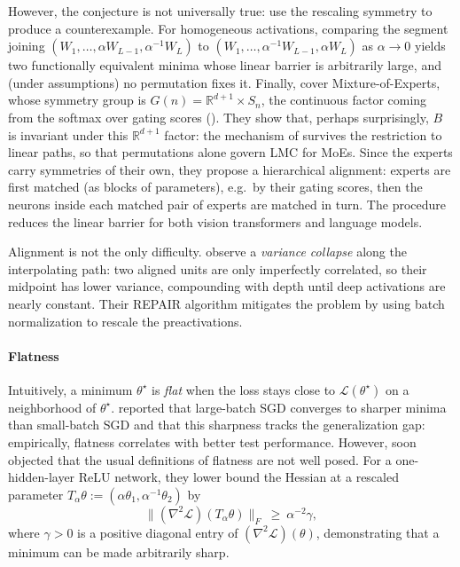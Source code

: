 \documentclass[mathematics,review,submit,moreauthors]{Definitions/mdpi}
\begin{document}
However, the conjecture is not universally true: \citet{zhao2025a} use the rescaling symmetry to produce a counterexample.
For homogeneous activations, comparing the segment joining $(W_1,\dots,\alpha W_{L-1},\alpha^{-1}W_L)$ to $(W_1,\dots,\alpha^{-1}W_{L-1},\alpha W_L)$ as $\alpha\to0$ yields two functionally equivalent minima whose linear barrier is arbitrarily large, and (under assumptions) no permutation fixes it.
Finally, \citet{tran2025anips} cover Mixture-of-Experts, whose symmetry group is $G(n)=\mathbb{R}^{d+1}\times S_n$, the continuous factor coming from the softmax over gating scores ().
They show that, perhaps surprisingly, $B$ is invariant under this $\mathbb{R}^{d+1}$ factor: the mechanism of  survives the restriction to linear paths, so that permutations alone govern LMC for MoEs.
Since the experts carry symmetries of their own, they propose a hierarchical alignment: experts are first matched (as blocks of parameters), e.g.\ by their gating scores, then the neurons inside each matched pair of experts are matched in turn.
The procedure reduces the linear barrier for both vision transformers and language models.

\begin{Remark}
    Alignment is not the only difficulty.
    \citet{jordan2023} observe a \emph{variance collapse} along the interpolating path: two aligned units are only imperfectly correlated, so their midpoint has lower variance, compounding with depth until deep activations are nearly constant.
    Their REPAIR algorithm mitigates the problem by using batch normalization to rescale the preactivations.
\end{Remark}

\paragraph{Flatness}

Intuitively, a minimum $\theta^\star$ is \emph{flat} when the loss stays close to $\mathcal{L}(\theta^\star)$ on a neighborhood of $\theta^\star$.
\citet{keskar2017} reported that large-batch SGD converges to sharper minima than small-batch SGD and that this sharpness tracks the generalization gap: empirically, flatness correlates with better test performance.
However, \citet{dinh2017} soon objected that the usual definitions of flatness are not well posed.
For a one-hidden-layer ReLU network, they lower bound the Hessian at a rescaled parameter $T_\alpha\theta:=(\alpha\theta_1,\alpha^{-1}\theta_2)$ by
\begin{equation}\label{eq:dinh-hessian-bound}
    \big\lVert(\nabla^2\mathcal{L})(T_\alpha\theta)\big\rVert_F\ \ge\ \alpha^{-2}\gamma,
\end{equation}
where $\gamma>0$ is a positive diagonal entry of $(\nabla^2\mathcal{L})(\theta)$, demonstrating that a minimum can be made arbitrarily sharp.
\end{document}
